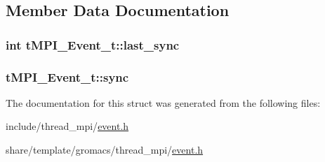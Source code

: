 \subsection{\-Member \-Data \-Documentation}
\hypertarget{structtMPI__Event__t_a580524ca5296c26f12c9057096f09455}{
\subsubsection[{last\-\_\-sync}]{\setlength{\rightskip}{0pt plus 5cm}int {\bf t\-M\-P\-I\-\_\-\-Event\-\_\-t\-::last\-\_\-sync}}}\label{structtMPI__Event__t_a580524ca5296c26f12c9057096f09455}
\hypertarget{structtMPI__Event__t_abbe22cec807214ee89b7aee75af9a608}{
\subsubsection[{sync}]{ {\bf t\-M\-P\-I\-\_\-\-Event\-\_\-t\-::sync}}}\label{structtMPI__Event__t_abbe22cec807214ee89b7aee75af9a608}


\-The documentation for this struct was generated from the following files\-:\begin{DoxyCompactItemize}
\item 
include/thread\-\_\-mpi/\hyperlink{include_2thread__mpi_2event_8h}{event.\-h}\item 
share/template/gromacs/thread\-\_\-mpi/\hyperlink{share_2template_2gromacs_2thread__mpi_2event_8h}{event.\-h}\end{DoxyCompactItemize}
